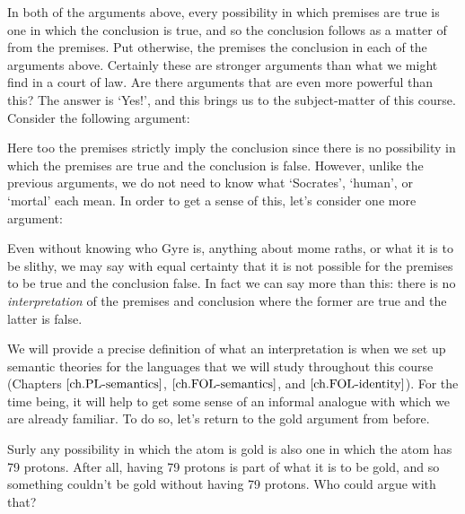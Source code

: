 \begin{earg}
\end{earg}

In both of the arguments above, every possibility in which premises are true is one in which the conclusion is true, and so the conclusion follows as a matter of  from the premises.
Put otherwise, the premises  the conclusion in each of the arguments above.
Certainly these are stronger arguments than what we might find in a court of law.
Are there arguments that are even more powerful than this?
The answer is `Yes!', and this brings us to the subject-matter of this course.
Consider the following argument:

\begin{earg}
\end{earg}

Here too the premises strictly imply the conclusion since there is no possibility in which the premises are true and the conclusion is false.
However, unlike the previous arguments, we do not need to know what `Socrates', `human', or `mortal' each mean.
In order to get a sense of this, let's consider one more argument:

\begin{earg}
\end{earg}

Even without knowing who Gyre is, anything about mome raths, or what it is to be slithy, we may say with equal certainty that it is not possible for the premises to be true and the conclusion false.
In fact we can say more than this: there is no \textit{interpretation} of the premises and conclusion where the former are true and the latter is false.

We will provide a precise definition of what an interpretation is when we set up semantic theories for the languages that we will study throughout this course (Chapters $\ref{ch.PL-semantics}$, $\ref{ch.FOL-semantics}$, and $\ref{ch.FOL-identity}$).
For the time being, it will help to get some sense of an informal analogue with which we are already familiar.
To do so, let's return to the gold argument from before.

Surly any possibility in which the atom is gold is also one in which the atom has 79 protons.
After all, having 79 protons is part of what it is to be gold, and so something couldn't be gold without having 79 protons.
Who could argue with that?

